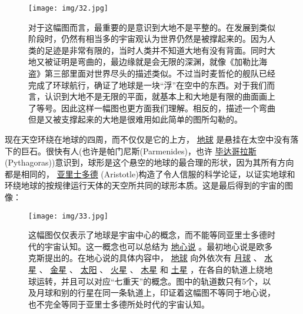 \begin{figure}[htbp]
\begin{minipage}[t]{0.3\linewidth}
\centering
\bc
\texttt{[image: img/32.jpg]}\\[12pt]
\ec
\caption{对于这幅图而言，最重要的是意识到大地不是平整的。在发展到类似阶段时，仍然有相当多的宇宙观认为世界仍然是被撑起来的。因为人类的足迹是非常有限的，当时人类并不知道大地有没有背面。同时大地又被证明是弯曲的，最边缘就是会无限的深渊，就像《加勒比海盗》第三部里面对世界尽头的描述类似。不过当时麦哲伦的舰队已经完成了环球航行，确证了地球是一块“浮”在空中的东西。对于我们而言，认识到大地不是无限的平面，就基本上和大地是有限的曲面画上了等号。因此这样一幅图也更方面我们理解。相反的，描述一个弯曲但是又被支撑起来的大地是很难用如此简单的图所勾勒的。}
\label{fig:side:a}
\end{minipage}

\end{figure}        

    现在天空环绕在地球的四周，而不仅仅是它的上方，
\href{http://toyhouse.cc/wiki/index.php/地球}{地球}
是悬挂在太空中没有落下的巨石。很快有人(也许是帕门尼斯(Parmenides)，也许
\href{http://toyhouse.cc/wiki/index.php/毕达哥拉斯}{毕达哥拉斯}
(Pythagoras))意识到，球形是这个悬空的地球的最合理的形状，因为其所有方向都是相同的，
\href{http://toyhouse.cc/wiki/index.php/亚里士多德}{亚里士多德}
(Aristotle)构造了令人信服的科学论证，以证实地球和环绕地球的按规律运行天体的天空所共同的球形本质。这是最后得到的宇宙的图像：
\begin{figure}[htbp]
\begin{minipage}[t]{0.3\linewidth}
\centering
\bc
\texttt{[image: img/33.jpg]}\\[12pt]
\ec
\caption{这幅图仅仅表示了地球是宇宙中心的概念，而不能等同亚里士多德时代的宇宙认知。这一概念也可以总结为
\href{http://toyhouse.cc/wiki/index.php/地心说}{地心说}
。最初地心说是欧多克斯提出的。在地心说的具体内容中，
\href{http://toyhouse.cc/wiki/index.php/地球}{地球}
向外依次有
\href{http://toyhouse.cc/wiki/index.php/月球}{月球}
、
\href{http://toyhouse.cc/wiki/index.php/水星}{水星}
、
\href{http://toyhouse.cc/wiki/index.php/金星}{金星}
、
\href{http://toyhouse.cc/wiki/index.php/太阳}{太阳}
、
\href{http://toyhouse.cc/wiki/index.php/火星}{火星}
、
\href{http://toyhouse.cc/wiki/index.php/木星}{木星}
和
\href{http://toyhouse.cc/wiki/index.php/土星}{土星}
，在各自的轨道上绕地球运转，并且可以对应“七重天”的概念。图中的轨道数只有5个，以及月球和别的行星在同一条轨道上，印证着这幅图不等同于地心说，也不完全等同于亚里士多德所处时代的宇宙认知。}
\label{fig:side:a}
\end{minipage}

\end{figure}        

